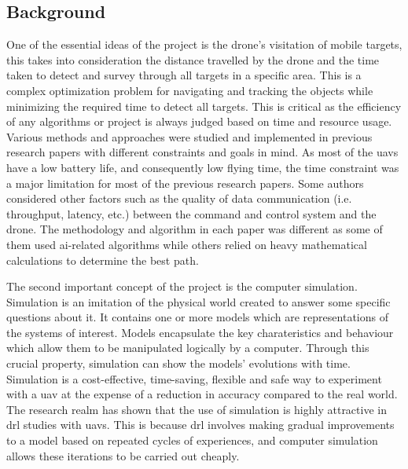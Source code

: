 \documentclass[../main.tex]{subfiles}
\begin{document}
\subsection{Background}

One of the essential ideas of the project 
is the drone's visitation of mobile 
targets, this takes into consideration 
the distance travelled by the drone and 
the time taken to detect and survey 
through all targets in a specific area.
This is a complex optimization problem 
for navigating and tracking the objects 
while minimizing the required time to detect all targets.
This is critical as the efficiency of any algorithms 
or project is always judged based on time 
and resource usage.
Various methods and approaches were studied 
and implemented 
in previous research papers with different 
constraints and 
goals in mind.
As most of the \glspl{uav} have a low battery life, 
and consequently low flying time, the time 
constraint was a major limitation 
for most of the previous research papers. 
Some authors considered other factors such 
as the quality 
of data communication (i.e. throughput, latency, etc.) 
between the command and control 
system and the drone.
The methodology and algorithm in each paper was 
different 
as some of them used \gls{ai}-related algorithms while 
others relied 
on heavy mathematical calculations to determine 
the best path.

The second important concept of the project is the computer simulation.
Simulation is an imitation of the physical world
created to answer some specific questions about it.
It contains one or more models 
which are representations of the systems of interest.
Models encapsulate the key charateristics and behaviour 
which allow them to be manipulated logically by a computer.
Through this crucial property, simulation can show 
the models' evolutions with time.
Simulation is a cost-effective, time-saving, flexible 
and safe way to experiment with a \gls{uav}
at the expense of a reduction in accuracy compared to the real world.
The research realm has shown that the use of simulation 
is highly attractive in \gls{drl} studies with \glspl{uav}.
This is because \gls{drl} involves
making gradual improvements to a model based on 
repeated cycles of experiences, and computer simulation 
allows these iterations to be carried out cheaply.
\end{document}
